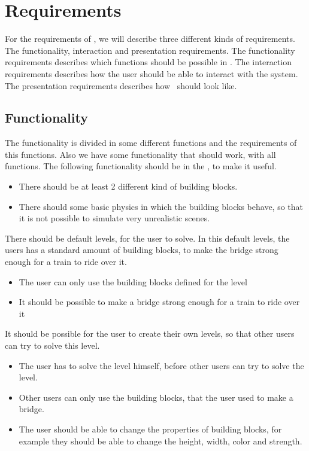 \section{Requirements}
For the requirements of \name, we will describe three different kinds of requirements. The functionality, interaction and presentation requirements. The functionality requirements describes which functions should be possible in \name. The interaction requirements describes how the user should be able to interact with the system. The presentation requirements describes how \name \ should look like. 
 \subsection{Functionality}
 The functionality is divided in some different functions and the requirements of this functions. Also we have some functionality that should work, with all functions.
 The following functionality should be in the \name, to make it useful.
  \begin{itemize}
  \item There should be at least 2 different kind of building blocks. 
  \item There should some basic physics in which the building blocks behave, so that it is not possible to simulate very unrealistic scenes.
  \end{itemize}
  There should be default levels, for the user to solve. In this default levels, the users has a standard amount of building blocks, to make the bridge strong enough for a train to ride over it. 
 \begin{itemize}
 \item The user can only use the building blocks defined for the level
 \item It should be possible to make a bridge strong enough for a train to ride over it
 \end{itemize}
  It should be possible for the user to create their own levels, so that other users can try to solve this level. 
 \begin{itemize}
 \item The user has to solve the level himself, before other users can try to solve the level.
 \item Other users can only use the building blocks, that the user used to make a bridge.
 \item The user should be able to change the properties of building blocks, for example they should be able to change the height, width, color and strength.
 \end{itemize}

